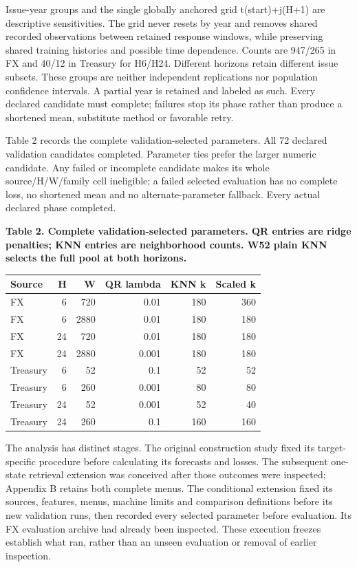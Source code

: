 \documentclass[10pt,a4paper]{article}
\begin{document}
Issue-year groups and the single globally anchored grid t(start)+j(H+1) are descriptive sensitivities. The grid never resets by year and removes shared recorded observations between retained response windows, while preserving shared training histories and possible time dependence. Counts are 947/265 in FX and 40/12 in Treasury for H6/H24. Different horizons retain different issue subsets. These groups are neither independent replications nor population confidence intervals. A partial year is retained and labeled as such. Every declared candidate must complete; failures stop its phase rather than produce a shortened mean, substitute method or favorable retry.

Table 2 records the complete validation-selected parameters. All 72 declared validation candidates completed. Parameter ties prefer the larger numeric candidate. Any failed or incomplete candidate makes its whole source/H/W/family cell ineligible; a failed selected evaluation has no complete loss, no shortened mean and no alternate-parameter fallback. Every actual declared phase completed.

\begin{center}
\begin{minipage}{\linewidth}
\small\textbf{Table 2. Complete validation-selected parameters. QR entries are ridge penalties; KNN entries are neighborhood counts. W52 plain KNN selects the full pool at both horizons.}\par\medskip
\centering\fontsize{8}{10}\selectfont
\begin{tabular}{lrrrrr}
\toprule
Source & H & W & QR lambda & KNN k & Scaled k \\
\midrule
FX & 6 & 720 & 0.01 & 180 & 360 \\
FX & 6 & 2880 & 0.01 & 180 & 180 \\
FX & 24 & 720 & 0.01 & 180 & 180 \\
FX & 24 & 2880 & 0.001 & 180 & 180 \\
Treasury & 6 & 52 & 0.1 & 52 & 52 \\
Treasury & 6 & 260 & 0.001 & 80 & 80 \\
Treasury & 24 & 52 & 0.001 & 52 & 40 \\
Treasury & 24 & 260 & 0.1 & 160 & 160 \\
\bottomrule
\end{tabular}
\end{minipage}
\end{center}
The analysis has distinct stages. The original construction study fixed its target-specific procedure before calculating its forecasts and losses. The subsequent one-state retrieval extension was conceived after those outcomes were inspected; Appendix B retains both complete menus. The conditional extension fixed its sources, features, menus, machine limits and comparison definitions before its new validation runs, then recorded every selected parameter before evaluation. Its FX evaluation archive had already been inspected. These execution freezes establish what ran, rather than an unseen evaluation or removal of earlier inspection.
\end{document}

